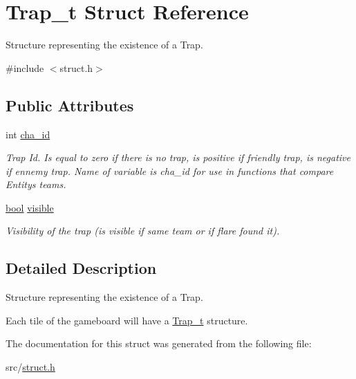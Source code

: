 \hypertarget{struct_trap__t}{}\section{Trap\+\_\+t Struct Reference}
\label{struct_trap__t}


Structure representing the existence of a Trap.  




{\ttfamily \#include $<$struct.\+h$>$}

\subsection*{Public Attributes}
\begin{DoxyCompactItemize}
\item 
\mbox{\label{struct_trap__t_a0155026ce99180189ad746853faf6725}} 
int \hyperlink{struct_trap__t_a0155026ce99180189ad746853faf6725}{cha\+\_\+id}
\begin{DoxyCompactList}\small\item\em Trap Id. Is equal to zero if there is no trap, is positive if friendly trap, is negative if ennemy trap. Name of variable is cha\+\_\+id for use in functions that compare Entity\textquotesingle{}s teams. \end{DoxyCompactList}\item 
\mbox{\label{struct_trap__t_a821ad0e5ce43d7135a52c3827ce3e8d9}} 
\hyperlink{common_8h_af6a258d8f3ee5206d682d799316314b1}{bool} \hyperlink{struct_trap__t_a821ad0e5ce43d7135a52c3827ce3e8d9}{visible}
\begin{DoxyCompactList}\small\item\em Visibility of the trap (is visible if same team or if flare found it). \end{DoxyCompactList}\end{DoxyCompactItemize}


\subsection{Detailed Description}
Structure representing the existence of a Trap. 

Each tile of the gameboard will have a \hyperlink{struct_trap__t}{Trap\+\_\+t} structure. 

The documentation for this struct was generated from the following file\+:\begin{DoxyCompactItemize}
\item 
src/\hyperlink{struct_8h}{struct.\+h}\end{DoxyCompactItemize}

